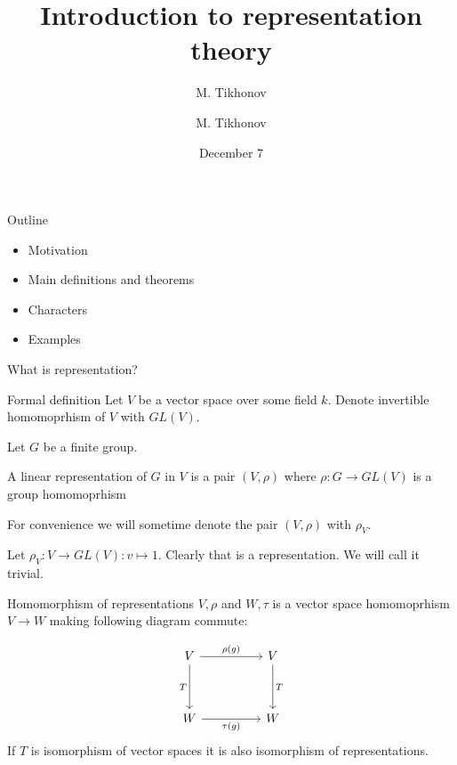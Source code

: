 \documentclass{beamer}
\author{M. Tikhonov}
\title{Introduction to representation theory}
\author{M. Tikhonov}
\institute{University of Virginia}
\date{December 7}
\begin{document}
\frame{\titlepage}

\begin{frame}{Outline}
    \begin{itemize}
        \item Motivation 
        \item Main definitions and theorems
        \item Characters
        \item Examples
    \end{itemize}
\end{frame}

\begin{frame}{What is representation?}

\end{frame}

\begin{frame}{Formal definition}
    Let $V$ be a vector space over some field $k$. Denote invertible homomoprhism of $V$ with $GL(V)$.

    Let $G$ be a finite group.
    \begin{definition}
        A linear representation of $G$ in $V$ is a pair $(V, \rho)$ where $\rho: G \to GL(V)$ is a group homomoprhism
    \end{definition}

    For convenience we will sometime denote the pair $(V, \rho)$ with $\rho_V$.

    \begin{example}
        Let $\rho_V : V \to GL(V): v \mapsto 1$.
        Clearly that is a representation. We will call it trivial.
    \end{example}

\end{frame}

\begin{frame}[fragile]
    \begin{definition}
        Homomorphism of representations $V, \rho$ and $W, \tau$ is a vector space homomoprhism $V \to W$ making following diagram commute:
    \end{definition}
    \[\begin{tikzcd}
        V && V \\
        \\
        W && W
        \arrow["{\rho(g)}", from=1-1, to=1-3]
        \arrow["T", from=1-3, to=3-3]
        \arrow["T"', from=1-1, to=3-1]
        \arrow["{\tau(g)}"', from=3-1, to=3-3]
    \end{tikzcd}\]
    If $T$ is isomorphism of vector spaces it is also isomorphism of representations.
\end{frame}
\end{document}
